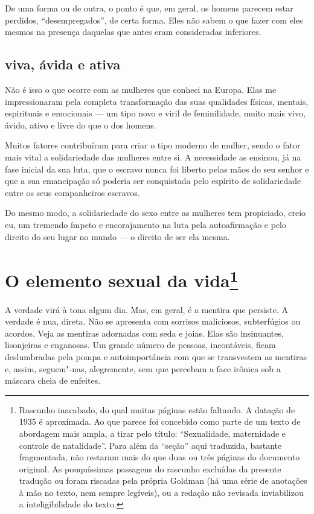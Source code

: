De uma forma ou de outra, o ponto é que, em geral, os homens parecem
estar perdidos, ``desempregados'', de certa forma. Eles não sabem o que
fazer com eles mesmos na presença daquelas que antes eram consideradas
inferiores.

\section{viva, ávida e ativa}

Não é isso o que ocorre com as mulheres que conheci na Europa. Elas me
impressionaram pela completa transformação das suas qualidades físicas,
mentais, espirituais e emocionais --- um tipo novo e viril de
feminilidade, muito mais vivo, ávido, ativo e livre do que o dos homens.

Muitos fatores contribuíram para criar o tipo moderno de mulher, sendo o
fator mais vital a solidariedade das mulheres entre si. A necessidade as
ensinou, já na fase inicial da sua luta, que o escravo nunca foi liberto
pelas mãos do seu senhor e que a sua emancipação só poderia ser
conquistada pelo espírito de solidariedade entre os seus companheiros
escravos.

Do mesmo modo, a solidariedade do sexo entre as mulheres tem propiciado,
creio eu, um tremendo ímpeto e encorajamento na luta pela autoafirmação
e pelo direito do seu lugar no mundo --- o direito de ser ela mesma.

\chapter{O elemento sexual da vida\footnote{Rascunho inacabado, do qual muitas
  páginas estão faltando. A datação de 1935 é aproximada. Ao que parece foi
  concebido como parte de um texto de abordagem mais ampla, a tirar pelo
  título: ``Sexualidade, maternidade e controle de natalidade''. Para
  além da ``seção'' aqui traduzida, bastante fragmentada, não restaram
  mais do que duas ou três páginas do documento original. As
  pouquíssimas passagens do rascunho excluídas da presente tradução ou
  foram riscadas pela própria Goldman (há uma série de anotações à mão
  no texto, nem sempre legíveis), ou a redação não revisada inviabilizou
  a inteligibilidade do texto.}}

A verdade virá à tona algum dia. Mas, em geral, é a mentira que
persiste. A verdade é nua, direta. Não se apresenta com sorrisos
maliciosos, subterfúgios ou acordos. Veja as mentiras adornadas com seda
e joias. Elas são insinuantes, lisonjeiras e enganosas. Um grande número de pessoas,
incontáveis, ficam deslumbradas pela pompa e autoimportância com que se
transvestem as mentiras e, assim, seguem"-nas, alegremente, sem que percebam
a face irônica sob a máscara cheia de enfeites.

